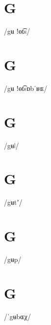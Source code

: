 \documentclass[10pt,a4paper,twoside]{book}
\begin{document}
\section*{G}

\begin{multicols}{3}
 {/gʉ ǃɵt͡s/} {}
\end{multicols}

\section*{G}

\begin{multicols}{3}
 {/gʉ ǃɵt͡sɒbˈʁɶ/} {}
\end{multicols}

\section*{G}

\begin{multicols}{3}
 {/gʉǀ/} {}
\end{multicols}

\section*{G}

\begin{multicols}{3}
 {/gʉtʼ/} {}
\end{multicols}

\section*{G}

\begin{multicols}{3}
 {/gʉp/} {}
\end{multicols}

\section*{G}

\begin{multicols}{3}
 {/ˈgʉbɶχ/} {}
\end{multicols}
\end{document}
